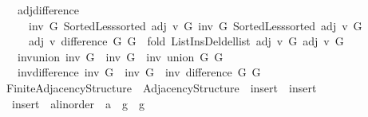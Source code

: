 \begin{isabellebody}
\ \ \ adj{\isacharunderscore}{\kern0pt}difference{\isacharcolon}{\kern0pt}\isanewline
\ \ \ \ {\isachardoublequoteopen}{\isasymlbrakk}\ inv\ G{}{\isacharsemicolon}{\kern0pt}\ Sorted{\isacharunderscore}{\kern0pt}Less{\isachardot}{\kern0pt}sorted\ {\isacharparenleft}{\kern0pt}adj\ v\ G{}{\isacharparenright}{\kern0pt}{\isacharsemicolon}{\kern0pt}\ inv\ G{}{\isacharsemicolon}{\kern0pt}\ Sorted{\isacharunderscore}{\kern0pt}Less{\isachardot}{\kern0pt}sorted\ {\isacharparenleft}{\kern0pt}adj\ v\ G{}{\isacharparenright}{\kern0pt}\ {\isasymrbrakk}\ {\isasymLongrightarrow}\isanewline
\ \ \ \ \ adj\ v\ {\isacharparenleft}{\kern0pt}difference\ G{}\ G{}{\isacharparenright}{\kern0pt}\ {\isacharequal}{\kern0pt}\ fold\ List{\isacharunderscore}{\kern0pt}Ins{\isacharunderscore}{\kern0pt}Del{\isachardot}{\kern0pt}del{\isacharunderscore}{\kern0pt}list\ {\isacharparenleft}{\kern0pt}adj\ v\ G{}{\isacharparenright}{\kern0pt}\ {\isacharparenleft}{\kern0pt}adj\ v\ G{}{\isacharparenright}{\kern0pt}{\isachardoublequoteclose}\isanewline
\ \ \ inv{\isacharunderscore}{\kern0pt}union{\isacharcolon}{\kern0pt}\ {\isachardoublequoteopen}inv\ G{}\ {\isasymLongrightarrow}\ inv\ G{}\ {\isasymLongrightarrow}\ inv\ {\isacharparenleft}{\kern0pt}union\ G{}\ G{}{\isacharparenright}{\kern0pt}{\isachardoublequoteclose}\isanewline
\ \ \ inv{\isacharunderscore}{\kern0pt}difference{\isacharcolon}{\kern0pt}\ {\isachardoublequoteopen}inv\ G{}\ {\isasymLongrightarrow}\ inv\ G{}\ {\isasymLongrightarrow}\ inv\ {\isacharparenleft}{\kern0pt}difference\ G{}\ G{}{\isacharparenright}{\kern0pt}{\isachardoublequoteclose}\isanewline
\isanewline
{}\isamarkupfalse%
\ Finite{\isacharunderscore}{\kern0pt}Adjacency{\isacharunderscore}{\kern0pt}Structure{\isacharunderscore}{\kern0pt}{}\ {\isacharequal}{\kern0pt}\ Adjacency{\isacharunderscore}{\kern0pt}Structure{\isacharunderscore}{\kern0pt}{}\ \ insert\ {\isacharequal}{\kern0pt}\ insert\ \isanewline
\ \ insert\ {\isacharcolon}{\kern0pt}{\isacharcolon}{\kern0pt}\ {\isachardoublequoteopen}{\isacharprime}{\kern0pt}a{\isacharcolon}{\kern0pt}{\isacharcolon}{\kern0pt}linorder\ {\isasymRightarrow}\ {\isacharprime}{\kern0pt}a\ {\isasymRightarrow}\ {\isacharprime}{\kern0pt}g\ {\isasymRightarrow}\ {\isacharprime}{\kern0pt}g{\isachardoublequoteclose}\ {\isacharplus}{\kern0pt}\isanewline

\end{isabellebody}
